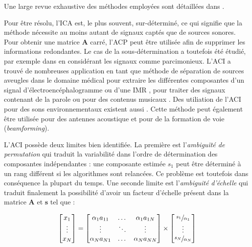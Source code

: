 Une large revue exhaustive des méthodes employées sont détaillées dans \cite{hyvarinen2004independent}.

Pour être résolu, l'ICA est, le plus souvent, sur-déterminé, ce qui signifie que la méthode nécessite au moins autant de signaux captés que de sources sonores. Pour obtenir une matrice $\mathbf{A}$ carré, l'ACP peut être utilisée afin de supprimer les informations redondantes.  Le cas de la sous-détermination a toutefois été étudié, par exemple dans \cite{bofill2000blind} en considérant les signaux comme parcimonieux.
L'ACI a trouvé de nombreuses application en tant que méthode de séparation de sources aveugles dans le domaine médical pour extraire les différentes composantes d'un signal d'électroencéphalogramme \cite{delorme2007enhanced,makeig1996independent} ou d'une IMR \cite{lee1999independent}, pour traiter des signaux contenant de la parole \cite{sarela2005denoising, hsieh2009independent} ou pour des contenus musicaux \cite{uhle2003extraction, abdallah2003independent}. Des utiliation de l'ACI pour des sons environnementaux existent aussi \cite{lombard2011tdoa, eronen2006audio}. Cette méthode peut également être utilisée pour des antennes acoustique et pour de la formation de voie (\textit{beamforming})\cite{cardoso_blind_1998,saruwatari2003blind}.

L'ACI possède deux limites bien identifiée. La première est l'\textit{ambiguïté de permutation} qui traduit la variabilité dans l'ordre de détermination des composantes indépendantes : une composante estimée $s_1$ peut être déterminé à un rang différent si les algorithmes sont relancées. Ce problème est toutefois dans conséquence la plupart du temps. Une seconde limite est l'\textit{ambiguité d'échelle} qui traduit finalement la possibilité d'avoir un facteur d'échelle présent dans la matrice $\mathbf{A}$ et $\mathbf{s}$ tel que : 

\begin{equation}
\begin{bmatrix}
x_{1}\\
\vdots\\
x_{N}
\end{bmatrix} =  
\begin{bmatrix}
\alpha_1 a_{11} & \dots & \alpha_1 a_{1N}\\
\vdots & \ddots & \vdots\\
\alpha_N a_{N1} & \dots & \alpha_N a_{NN}
\end{bmatrix}
\times
\begin{bmatrix}
\sfrac{s_{1}}{\alpha_1}\\
\vdots\\
\sfrac{s_{N}}{\alpha_N}
\end{bmatrix}
\end{equation}

